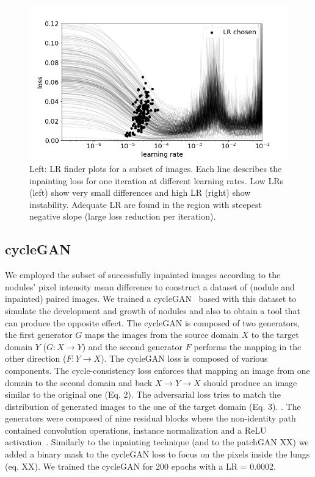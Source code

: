 \documentclass[runningheads]{llncs}
\begin{document}
\begin{figure}
\includegraphics[width=\textwidth]{learning-rate.png}
\caption{Left: LR finder plots for a subset of images. Each line describes the inpainting loss for one iteration at different learning rates. Low LRs (left) show very small differences and high LR (right) show instability. Adequate LR are found in the region with steepest negative slope (large loss reduction per iteration).  } \label{fig2}
\end{figure}

\subsection{cycleGAN}
We employed the subset of successfully inpainted images according to the nodules' pixel intensity mean difference to construct a dataset of (nodule and inpainted) paired images. We trained a cycleGAN~\cite{CycleGAN2017} based with this dataset to simulate the development and growth of nodules and also to obtain a tool that can produce the opposite effect. The cycleGAN is composed of two generators, the first generator \(G\) maps the images from the source domain \(X\) to the target domain \(Y\) (\(G: X \rightarrow Y\)) and the second generator \(F\) performs the mapping in the other direction (\(F: Y \rightarrow X\)). The cycleGAN loss is composed of  various components. The cycle-consistency loss enforces that mapping an image from one domain to the second domain and back \(X \rightarrow Y \rightarrow X\) should produce an image similar to the original one (Eq. 2). The adversarial loss tries to match the distribution of generated images to the one of the target domain (Eq. 3). . The generators were composed of nine residual blocks where the non-identity path contained convolution operations, instance normalization and a ReLU activation~\cite{CycleGAN2017}. Similarly to the inpainting technique (and to the patchGAN XX) we added a binary mask to the cycleGAN loss to focus on the pixels inside the lungs (eq. XX). We trained the cycleGAN for 200 epochs with a LR = 0.0002. 
\end{document}
